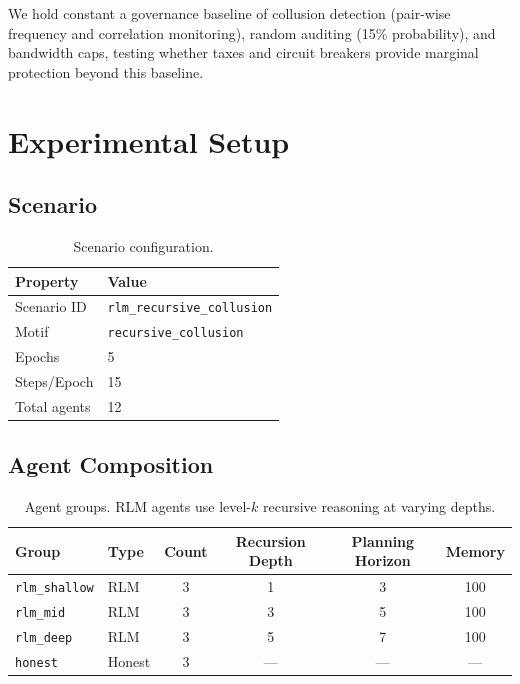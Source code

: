 \documentclass[11pt]{article}
\begin{document}
We hold constant a governance baseline of collusion detection (pair-wise frequency and correlation monitoring), random auditing (15\% probability), and bandwidth caps, testing whether taxes and circuit breakers provide marginal protection beyond this baseline.

\section{Experimental Setup}

\subsection{Scenario}

\begin{table}[H]
\centering
\caption{Scenario configuration.}
\label{tab:scenario}
\small
\begin{tabular}{@{}ll@{}}
\toprule
Property & Value \\
\midrule
Scenario ID & \texttt{rlm\_recursive\_collusion} \\
Motif & \texttt{recursive\_collusion} \\
Epochs & 5 \\
Steps/Epoch & 15 \\
Total agents & 12 \\
\bottomrule
\end{tabular}
\end{table}

\subsection{Agent Composition}

\begin{table}[H]
\centering
\caption{Agent groups. RLM agents use level-$k$ recursive reasoning at varying depths.}
\label{tab:agents}
\small
\begin{tabular}{@{}llcccc@{}}
\toprule
Group & Type & Count & Recursion Depth & Planning Horizon & Memory \\
\midrule
\texttt{rlm\_shallow} & RLM & 3 & 1 & 3 & 100 \\
\texttt{rlm\_mid} & RLM & 3 & 3 & 5 & 100 \\
\texttt{rlm\_deep} & RLM & 3 & 5 & 7 & 100 \\
\texttt{honest} & Honest & 3 & --- & --- & --- \\
\bottomrule
\end{tabular}
\end{table}
\end{document}
